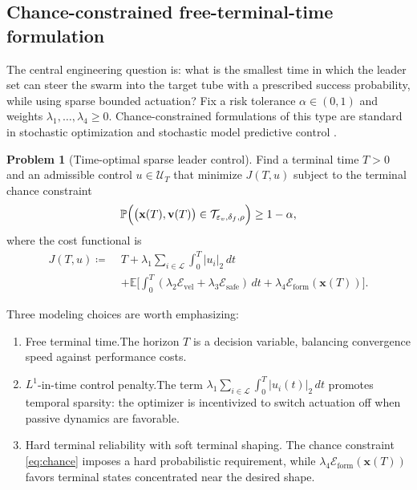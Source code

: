 \documentclass[pdflatex,sn-mathphys-num]{sn-jnl}%
\numberwithin{equation}{section}
\theoremstyle{thmstyleone}%
\theoremstyle{remark}
\theoremstyle{definition}
\newtheorem{problem}{Problem}
\newcommand{\E}{\mathbb{E}}
\newcommand{\Prob}{\mathbb{P}}
\newcommand{\calL}{\mathcal{L}}
\newcommand{\calU}{\mathcal{U}}
\newcommand{\calT}{\mathcal{T}}
\newcommand{\calE}{\mathcal{E}}
\begin{document}
\subsection{Chance-constrained free-terminal-time formulation}
\label{subsec:chance}
The central engineering question is: what is the smallest time in which the
leader set can steer the swarm into the target tube with a prescribed
success probability, while using sparse bounded actuation? Fix a risk
tolerance $\alpha\in(0,1)$ and weights $\lambda_1,\dots,\lambda_4\ge 0$.
Chance-constrained formulations of this type are standard in stochastic
optimization and stochastic model predictive control
\cite{nemirovski2007convex,campi2008exact,mesbah2016stochastic,
banerjea1998stochastic}.
\begin{problem}[Time-optimal sparse leader control]\label{prob:main}
Find a terminal time $T>0$ and an admissible control $u\in\calU_T$ that
minimize $J(T,u)$ subject to the terminal chance constraint
\begin{equation}\label{eq:chance}
  \Prob\Bigl( \bigl(\mathbf{x}(T),\mathbf{v}(T)\bigr)\in\calT_{\varepsilon_v,\delta_f,\rho} \Bigr)
    \ge 1-\alpha,
\end{equation}
where the cost functional is
\begin{equation}\label{eq:J}
\begin{aligned}
  J(T,u) \coloneqq\;& T + \lambda_1\sum_{i\in\calL}\int_0^T |u_i|_2\,dt \\
  &+ \E\biggl[ \int_0^T (\lambda_2\calE_{\mathrm{vel}}
     + \lambda_3\calE_{\mathrm{safe}})\,dt
     + \lambda_4\calE_{\mathrm{form}}(\mathbf{x}(T)) \biggr].
\end{aligned}
\end{equation}
\end{problem}
Three modeling choices are worth emphasizing:
\begin{enumerate}[label=(\roman*)]
\item Free terminal time.\enspace The horizon $T$ is a decision
variable, balancing convergence speed against performance costs.
\item $L^1$-in-time control penalty.\enspace The term
$\lambda_1\sum_{i\in\calL}\int_0^T |u_i(t)|_2\,dt$ promotes temporal
sparsity: the optimizer is incentivized to switch actuation off when passive
dynamics are favorable.
\item Hard terminal reliability with soft terminal shaping.\enspace
The chance constraint \eqref{eq:chance} imposes a hard probabilistic
requirement, while $\lambda_4\calE_{\mathrm{form}}(\mathbf{x}(T))$ favors terminal
states concentrated near the desired shape.
\end{enumerate}
\end{document}
